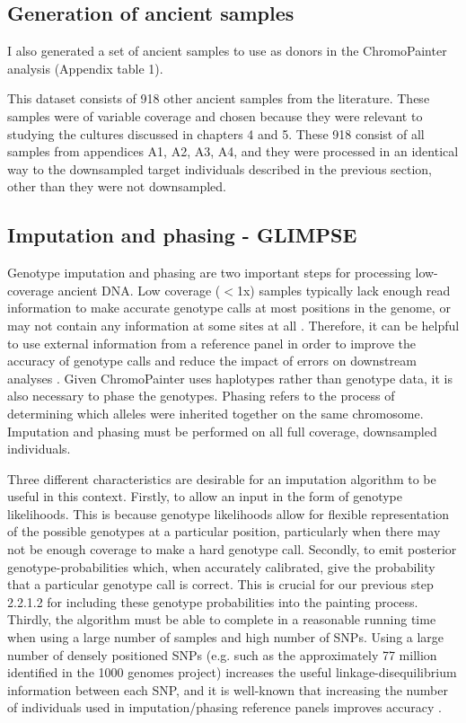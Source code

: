 \subsection{Generation of ancient samples} \label{AncientReferenceSamples}

I also generated a set of ancient samples to use as donors in the ChromoPainter analysis (Appendix table 1).

This dataset consists of 918 other ancient samples from the literature. These samples were of variable coverage and chosen because they were relevant to studying the cultures discussed in chapters 4 and 5. These 918 consist of all samples from appendices A1, A2, A3, A4, and they were processed in an identical way to the downsampled target individuals described in the previous section, other than they were not downsampled.  

\subsection{Imputation and phasing - GLIMPSE}

Genotype imputation and phasing are two important steps for processing low-coverage ancient DNA. Low coverage ($<$1x) samples typically lack enough read information to make accurate genotype calls at most positions in the genome, or may not contain any information at some sites at all \cite{nielsen2011genotype}. Therefore, it can be helpful to use external information from a reference panel in order to improve the accuracy of genotype calls and reduce the impact of errors on downstream analyses \cite{rubinacci2021efficient}. Given ChromoPainter uses haplotypes rather than genotype data, it is also necessary to phase the genotypes. Phasing refers to the process of determining which alleles were inherited together on the same chromosome. Imputation and phasing must be performed on all full coverage, downsampled individuals. 

Three different characteristics are desirable for an imputation algorithm to be useful in this context. Firstly, to allow an input in the form of genotype likelihoods. This is because genotype likelihoods allow for flexible representation of the possible genotypes at a particular position, particularly when there may not be enough coverage to make a hard genotype call. Secondly, to emit posterior genotype-probabilities which, when accurately calibrated, give the probability that a particular genotype call is correct. This is crucial for our previous step 2.2.1.2 for including these genotype probabilities into the painting process. Thirdly, the algorithm must be able to complete in a reasonable running time when using a large number of samples and high number of SNPs. Using a large number of densely positioned SNPs (e.g. such as the approximately 77 million identified in the 1000 genomes project) increases the useful linkage-disequilibrium information between each SNP, and it is well-known that increasing the number of individuals used in imputation/phasing reference panels improves accuracy \cite{delaneau2018integrative, HUANG2009235, mccarthy2016reference, rubinacci2021efficient}. 

